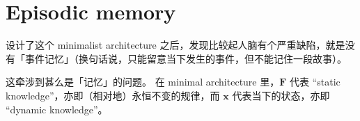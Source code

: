 \documentclass[orivec]{llncs}
\newcommand{\emp}[1]{\textbf{\textcolor{Cerulean}{#1}}}
\newcommand{\vect}[1]{\boldsymbol{#1}}
\begin{document}

\section{Episodic memory}

设计了这个 minimalist architecture 之后，发现比较起人脑有个严重缺陷，就是没有「事件记忆」（换句话说，只能留意当下发生的事件，但不能记住一段故事）。

这牵涉到甚么是「记忆」的问题。 在 minimal architecture 里，$\vect{F}$ 代表 ``static knowledge''，亦即（相对地）永恒不变的规律，而 $\vect{x}$ 代表当下的状态，亦即 ``dynamic knowledge''。
\end{document}

